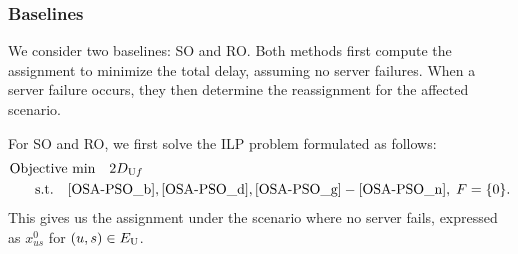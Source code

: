 \documentclass[conference]{IEEEtran}
\begin{document}
\begin{CJK}{UTF8}{ipxm}
\subsubsection{Baselines}
We consider two baselines: SO and RO.
Both methods first compute the assignment to minimize the total delay, assuming no server failures.
When a server failure occurs, they then determine the reassignment for the affected scenario.

For SO and RO, we first solve the ILP problem formulated as follows:
\begin{subequations} \label{OSA-SO-f0}
  \begin{align}
  \text{Objective}&\text{ min}\quad 2D_{\mathrm{U}f} \label{OSA-SO-f0_a} \\
  \rm{s.t.} \quad
  & \eqref{OSA-PSO_b}, \eqref{OSA-PSO_d}, \eqref{OSA-PSO_g}-\eqref{OSA-PSO_n}, \; F = \{0\}. \label{OSA-SO-f0_b}
  \end{align}
\end{subequations}
This gives us the assignment under the scenario where no server fails, expressed as $x^0_{us}$ for $(u,s) \in E_{\rm{U}}$.


\end{CJK}
\end{document}
